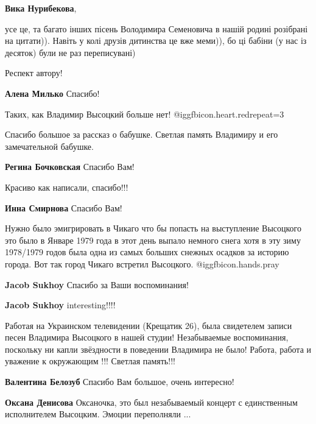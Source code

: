 \begin{itemize}
\begin{itemize}
\textbf{Вика Нурибекова}, 

усе це, та багато інших пісень Володимира Семеновича в нашій родині розібрані
на цитати)). Навіть у колі друзів дитинства це вже меми)), бо ці бабіни (у нас
із десяток) були не раз переписувані)

\end{itemize} %

Респект автору!

\textbf{Алена Милько} Спасибо!

Таких, как Владимир Высоцкий больше нет! @igg{fbicon.heart.red}{repeat=3}

Спасибо большое за рассказ о бабушке. Светлая память Владимиру и его замечательной бабушке.

\textbf{Регина Бочковская} Спасибо Вам!

Красиво как написали, спасибо!!!

\textbf{Инна Смирнова} Спасибо Вам!


Нужно было эмигрировать в Чикаго что бы попасть на выступление Высоцкого это
было в Январе 1979 года в этот день выпало немного снега хотя в эту зиму
1978/1979 годов была одна из самых больших снежных осадков за историю
города. Вот так город Чикаго встретил Высоцкого.  @igg{fbicon.hands.pray} 

\begin{itemize} %
\textbf{Jacob Sukhoy} Спасибо за Ваши воспоминания!

\textbf{Jacob Sukhoy} interesting!!!!
\end{itemize} %


Работая на Украинском телевидении (Крещатик 26), была свидетелем записи песен
Владимира Высоцкого в нашей студии! Незабываемые воспоминания, поскольку ни
капли звёздности в поведении Владимира не было! Работа, работа и уважение к
окружающим !!! Светлая память!!!

\begin{itemize} %
\textbf{Валентина Белозуб} Спасибо Вам большое, очень интересно!

\textbf{Оксана Денисова} Оксаночка, это был незабываемый концерт с единственным исполнителем Высоцким. Эмоции переполняли ...


\end{itemize}
\end{itemize}
